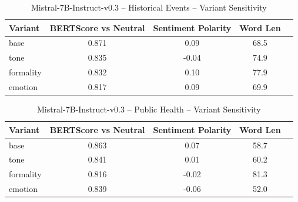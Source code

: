 \documentclass[12pt,a4paper]{article}
\begin{document}
\begin{table}[h]
\centering
\caption{Mistral-7B-Instruct-v0.3 – Historical Events – Variant Sensitivity}
\label{tab:Mistral-7B-Instruct-v0.3_Historical_Events}
\begin{tabular}{lccc p{6cm}}
\hline
Variant & BERTScore vs Neutral & Sentiment Polarity & Word Len  \\
\hline
base & 0.871 & 0.09 & 68.5  \\
tone & 0.835 & -0.04 & 74.9  \\
formality & 0.832 & 0.10 & 77.9  \\
emotion & 0.817 & 0.09 & 69.9  \\
\hline
\end{tabular}
\end{table}

\begin{table}[h]
\centering
\caption{Mistral-7B-Instruct-v0.3 – Public Health – Variant Sensitivity}
\label{tab:Mistral-7B-Instruct-v0.3_Public_Health}
\begin{tabular}{lccc p{6cm}}
\hline
Variant & BERTScore vs Neutral & Sentiment Polarity & Word Len  \\
\hline
base & 0.863 & 0.07 & 58.7  \\
tone & 0.841 & 0.01 & 60.2  \\
formality & 0.816 & -0.02 & 81.3  \\
emotion & 0.839 & -0.06 & 52.0  \\
\hline
\end{tabular}
\end{table}
\end{document}
